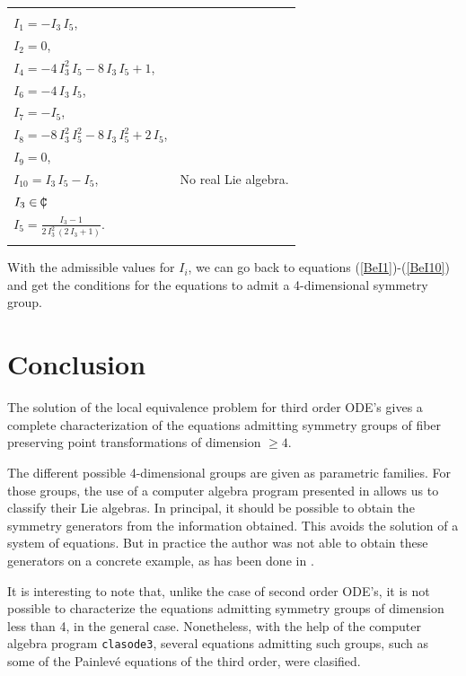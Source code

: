 \begin{table}[h]
\begin{tabular}{|l|l|}
\hline                 
& \\ 
$I_{1}= - I_{3}\,I_{5}$,& \\ 
$I_{2}=0$, & \\ 
$I_{4}=-4\,I_{3}^{2}\,I_{5}-8\,I_{3}\,I_{5}+1$,& \\
$I_{6}=-4\,I_{3}\,I_{5}$, & \\
$I_{7}= - I_{5}$, & \\
$I_{8}=-8\,I_{3}^{2}\,I_{5}^{2}-8\,I_{3}\,I_{5}^{2}+2\,I_{5}$, & \\
$I_{9}=0$, & \\
$I_{10}=I_{3}\,I_{5} - I_{5}$, & No real Lie algebra. \\
$I_{3} \in \,\,\mid\!\!\!\!{\tt C}$ & \\
$I_{5}=\frac{I_{3} - 1}{2\,I_{3}^{2}\,(2\,I_{3} + 1)}$. & \\
& \\
\hline 
\end{tabular}
\end{table}
With the admissible values for $I_{i}$, we can go back to equations 
(\ref{BeI1})-(\ref{BeI10}) and get the conditions for the equations to 
admit a 4-dimensional symmetry group.

%

\section{Conclusion}
The solution of the local equivalence problem for third order ODE's 
gives a complete characterization of the equations admitting symmetry 
groups of fiber preserving point transformations of dimension $\geq 4$. 

The different possible 4-dimensional groups are given as parametric 
families. For those groups, the use of a computer algebra program 
presented in \cite{P_Schobel92} allows us to classify their Lie 
algebras. In principal, it should be possible 
to obtain the symmetry generators from the information obtained. This 
avoids the solution of a system of equations. But in practice the author 
was not able to obtain these generators on a concrete example, as has been 
done in \cite{P_KarlMacC82}.

It is interesting to note that, unlike the case of second order ODE's, 
it is not possible to characterize the equations admitting symmetry groups 
of dimension less than 4, in the general case. Nonetheless, with the help 
of the computer algebra program {\tt clasode3}, several equations admitting 
such groups, such as some of the Painlev\'{e} equations of the third order, 
were clasified. 

